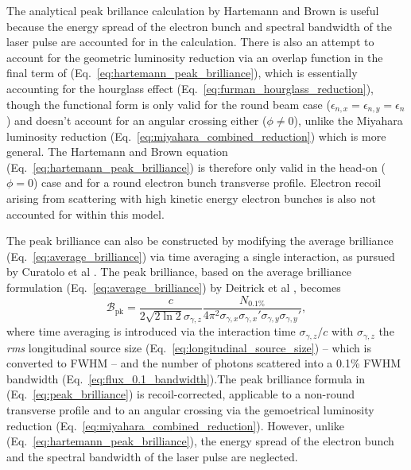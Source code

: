 \documentclass[../main.tex]{subfiles}
\begin{document}
The analytical peak brillance calculation by Hartemann and Brown \cite{hartemann2005high} is useful because the energy spread of the electron bunch and spectral bandwidth of the laser pulse are accounted for in the calculation. There is also an attempt to account for the geometric luminosity reduction via an overlap function in the final term of (Eq.~\ref{eq:hartemann_peak_brilliance}), which is essentially accounting for the hourglass effect \cite{furman1991hourglass} (Eq.~\ref{eq:furman_hourglass_reduction}), though the functional form is only valid for the round beam case ($\epsilon_{n,x} = \epsilon_{n,y} = \epsilon_{n}$) and doesn't account for an angular crossing either ($\phi\neq0$), unlike the Miyahara luminosity reduction \cite{miyahara2008luminosity} (Eq.~\ref{eq:miyahara_combined_reduction}) which is more general. The Hartemann and Brown equation (Eq.~\ref{eq:hartemann_peak_brilliance}) is therefore only valid in the head-on ($\phi=0$) case and for a round electron bunch transverse profile. Electron recoil arising from scattering with high kinetic energy electron bunches is also not accounted for within this model.

The peak brilliance can also be constructed by modifying the average brilliance (Eq.~\ref{eq:average_brilliance}) via time averaging a single interaction, as pursued by Curatolo et al \cite{curatolo2017analytical}. The peak brilliance, based on the average brilliance formulation (Eq.~\ref{eq:average_brilliance}) by Deitrick et al \cite{deitrick2018high}, becomes
\begin{equation}
\mathcal{B}_{\mathrm{pk}} = \frac{c}{2\sqrt{2\ln2}\sigma_{\gamma,z}}\frac{N_{0.1\%}}{4\pi^{2}\sigma_{\gamma,x}\sigma_{\gamma,x}'\sigma_{\gamma,y}\sigma_{\gamma,y}'},
\label{eq:peak_brilliance}    
\end{equation}
where time averaging is introduced via the interaction time $\sigma_{\gamma,z}/c$ with $\sigma_{\gamma,z}$ the \textit{rms} longitudinal source size (Eq.~\ref{eq:longitudinal_source_size}) -- which is converted to FWHM -- and the number of photons scattered into a 0.1\% FWHM bandwidth (Eq.~\ref{eq:flux_0.1_bandwidth}).The peak brilliance formula in (Eq.~\ref{eq:peak_brilliance}) is recoil-corrected, applicable to a non-round transverse profile and to an angular crossing via the gemoetrical luminosity reduction (Eq.~\ref{eq:miyahara_combined_reduction}). However, unlike (Eq.~\ref{eq:hartemann_peak_brilliance}), the energy spread of the electron bunch and the spectral bandwidth of the laser pulse are neglected. 
\end{document}
